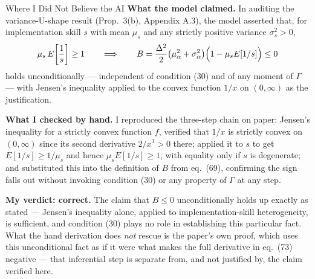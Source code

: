 \documentclass[aspectratio=169,11pt]{beamer}
\begin{document}
\begin{frame}{Where I Did Not Believe the AI}
  \small
  \textbf{What the model claimed.} In auditing the variance-U-shape result
  (Prop.\ 3(b), Appendix A.3), the model asserted that, for implementation
  skill $s$ with mean $\mu_s$ and any strictly positive variance
  $\sigma_s^2>0$,
  \[
    \mu_s\,E\!\left[\frac{1}{s}\right]\geq1
    \qquad\Longrightarrow\qquad
    B=\frac{\Delta^2}{2}\bigl(\mu_\alpha^2+\sigma_\alpha^2\bigr)
      \Bigl(1-\mu_sE[1/s]\Bigr)\leq0
  \]
  holds unconditionally --- independent of condition (30) and of any moment
  of $\Gamma$ --- with Jensen's inequality applied to the convex function
  $1/x$ on $(0,\infty)$ as the justification.

  \smallskip
  \textbf{What I checked by hand.} I reproduced the three-step chain on
  paper: Jensen's inequality for a strictly convex function $f$, verified
  that $1/x$ is strictly convex on $(0,\infty)$ since its second derivative
  $2/x^3>0$ there; applied it to $s$ to get $E[1/s]\geq1/\mu_s$ and hence
  $\mu_sE[1/s]\geq1$, with equality only if $s$ is degenerate; and
  substituted this into the definition of $B$ from eq.\ (69), confirming the
  sign falls out without invoking condition (30) or any property of $\Gamma$
  at any step.

  \smallskip
  \textbf{My verdict: correct.} The claim that $B\leq0$ unconditionally
  holds up exactly as stated --- Jensen's inequality alone, applied to
  implementation-skill heterogeneity, is sufficient, and condition (30)
  plays no role in establishing this particular fact. What the hand
  derivation does \emph{not} rescue is the paper's own proof, which uses
  this unconditional fact as if it were what makes the full derivative in
  eq.\ (73) negative --- that inferential step is separate from, and not
  justified by, the claim verified here.
\end{frame}
\end{document}
